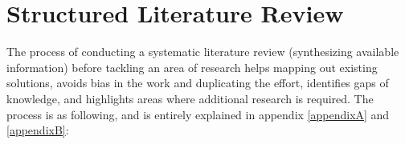 \section{Structured Literature Review}

The process of conducting a systematic literature review (synthesizing available information) before tackling an area of research helps mapping out existing solutions, avoids bias in the work and duplicating the effort, identifies gaps of knowledge, and highlights areas where additional research is required\citep{kofod2014}. The process is as following, and is entirely explained in appendix \ref{appendixA} and \ref{appendixB}:
